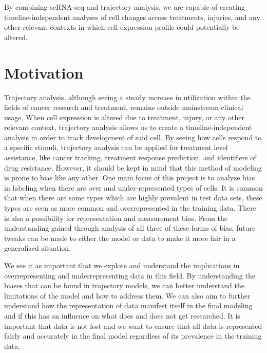 \documentclass{article}
\begin{document}
By combining scRNA-seq and trajectory analysis, we are capable of creating timeline-independent analyses of cell changes across treatments, injuries, and any other relevant contexts in which cell expression profile could potentially be altered.

\section{Motivation}
Trajectory analysis, although seeing a steady increase in utilization within the fields of cancer research and treatment, remains outside mainstream clinical usage. When cell expression is altered due to treatment, injury, or any other relevant context, trajectory analysis allows us to create a timeline-independent analysis in order to track development of said cell. By seeing how cells respond to a specific stimuli, trajectory analysis can be applied for treatment level assistance, like cancer tracking, treatment response prediction, and identifiers of drug resistance. However, it should be kept in mind that this method of modeling is prone to bias like any other. One main focus of this project is to analyze bias in labeling when there are over and under-represented types of cells. It is common that when there are some types which are highly prevalent in test data sets, these types are seen as more common and overrepresented in the training data. There is also a possibility for representation and measurement bias. From the understanding gained through analysis of all three of these forms of bias, future tweaks can be made to either the model or data to make it more fair in a generalized situation.

We see it as important that we explore and understand the implications in overrepresenting and underrepresenting data in this field. By understanding the biases that can be found in trajectory models, we can better understand the limitations of the model and how to address them. We can also aim to further understand how the representation of data manifest itself in the final modeling and if this has an influence on what does and does not get researched. It is important that data is not lost and we want to ensure that all data is represented fairly and accurately in the final model regardless of its prevalence in the training data.
\end{document}
